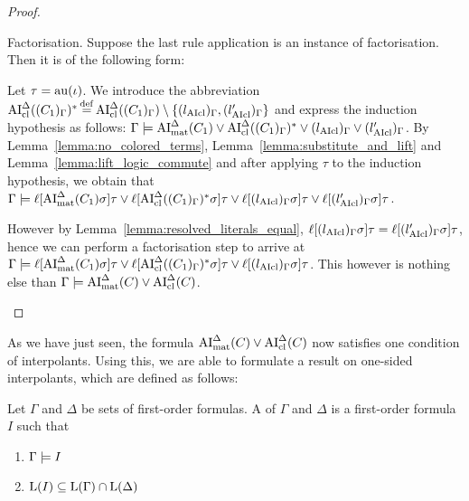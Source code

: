 \documentclass[,%
	draft=false,%
	numbers=noendperiod
	11pt,
	a4paper,
	oneside,%
	openany,
]{memoir}
\begin{document}
\begin{proof}
\begin{description}
\begin{enumerate}
			\end{enumerate}



		\item{Factorisation.}
			Suppose the last rule application is an instance of factorisation. Then it is of the following form:
			\begin{prooftree}
			\end{prooftree}

			Let $\tau = \operatorname{au}(\iota)$.
			We introduce the abbreviation $\operatorname{AI}_\mathrm{cl}^\Delta( (C_1)_\Gamma)^* \operatorname{\stackrel{\mathrm{def}}{=}} \operatorname{AI}_\mathrm{cl}^\Delta( (C_1)_\Gamma) \setminus \{ (l_{\operatorname{AIcl}})_\Gamma , (l'_{\operatorname{AIcl}})_\Gamma \}$ and express the induction hypothesis as follows:
			$\Gamma \models \operatorname{AI}_\mathrm{mat}^\Delta(C_1) \lor \operatorname{AI}_\mathrm{cl}^\Delta( (C_1)_\Gamma)^* \lor (l_{\operatorname{AIcl}})_\Gamma \lor (l'_{\operatorname{AIcl}})_\Gamma $.
			By Lemma~\ref{lemma:no_colored_terms}, Lemma~\ref{lemma:substitute_and_lift} and Lemma~\ref{lemma:lift_logic_commute} and after applying $\tau$ to the induction hypothesis, we obtain that
			$\Gamma \models \ell[\operatorname{AI}_\mathrm{mat}^\Delta(C_1)\sigma]\tau \lor \ell[\operatorname{AI}_\mathrm{cl}^\Delta( (C_1)_\Gamma)^*\sigma]\tau \lor \ell[(l_{\operatorname{AIcl}})_\Gamma \sigma]\tau \lor \ell[(l'_{\operatorname{AIcl}})_\Gamma\sigma]\tau $.

			However by Lemma~\ref{lemma:resolved_literals_equal},
			$\ell[(l_{\operatorname{AIcl}})_\Gamma\sigma]\tau =
			\ell[(l'_{\operatorname{AIcl}})_\Gamma\sigma]\tau$, hence we can perform a factorisation step to arrive at
			$\Gamma \models \ell[\operatorname{AI}_\mathrm{mat}^\Delta(C_1)\sigma]\tau \lor \ell[\operatorname{AI}_\mathrm{cl}^\Delta( (C_1)_\Gamma)^*\sigma]\tau \lor \ell[(l_{\operatorname{AIcl}})_\Gamma \sigma]\tau$.
			This however is nothing else than $\Gamma\models \operatorname{AI}_\mathrm{mat}^\Delta(C) \lor \operatorname{AI}_\mathrm{cl}^\Delta(C)$.
			\qedhere
	\end{description}
\end{proof}


As we have just seen, the formula $\operatorname{AI}_\mathrm{mat}^\Delta(C) \lor \operatorname{AI}_\mathrm{cl}^\Delta(C)$ now satisfies one condition of interpolants.
Using this, we are able to formulate a result on one-sided interpolants, which are defined as follows:

\begin{defi}
	Let $\Gamma$ and $\Delta$ be sets of first-order formulas.
	A  of $\Gamma$ and $\Delta$ is a first-order formula $I$ such that
	\begin{enumerate}
		\item $\Gamma \models I$
		\item $\operatorname{L}(I) \subseteq \operatorname{L}(\Gamma) \cap \operatorname{L}(\Delta)$
			\qedhere
	\end{enumerate}
\end{defi}
\end{document}
